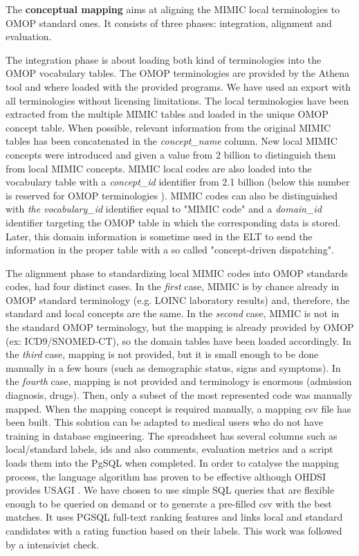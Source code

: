 The \textbf{conceptual mapping} aims at aligning the MIMIC local terminologies
to OMOP standard ones. It consists of three phases: integration, alignment and
evaluation.

The integration phase is about loading both kind of terminologies into the OMOP
vocabulary tables.
The OMOP terminologies are provided by the Athena tool \cite{ohdsi-athena} and
where loaded with the provided programs. We have used an export with all
terminologies without licensing limitations.
The local terminologies have been extracted from the multiple MIMIC tables and
loaded in the unique OMOP concept table. When possible, relevant information
from the original MIMIC tables has been concatenated in the
\textit{concept\_name} column. 
New local MIMIC concepts were introduced and given a value from 2 billion to
distinguish them from local MIMIC concepts.  MIMIC local codes are also loaded
into the vocabulary table with a \textit{concept\_id} identifier from 2.1
billion (below this number is reserved for OMOP terminologies
\cite{omop-documentation-pdf}). 
MIMIC codes can also be distinguished with \textit{the vocabulary\_id}
identifier equal to "MIMIC code" and a \textit{domain\_id} identifier targeting
the OMOP table in which the corresponding data is stored. Later, this domain
information is sometime used in the ELT to send the information in the proper
table with a so called "concept-driven dispatching".

The alignment phase to standardizing local MIMIC codes into OMOP standards
codes, had four distinct cases. In the \emph{first} case, MIMIC is by chance
already in OMOP standard terminology (e.g. LOINC laboratory results) and,
therefore, the standard and local concepts are the same. In the \emph{second}
case, MIMIC is not in the standard OMOP terminology, but the mapping is already
provided by OMOP (ex: ICD9/SNOMED-CT), so the domain tables have been loaded
accordingly.  In the \emph{third} case, mapping is not provided, but it is
small enough to be done manually in a few hours (such as demographic status,
signs and symptoms). In the \emph{fourth} case, mapping is not provided and
terminology is enormous (admission diagnosis, drugs). Then, only a subset of
the most represented code was manually mapped.
When the mapping concept is required manually, a mapping csv file has been
built.  This solution can be adapted to medical users who do not have training
in database engineering. The spreadsheet has several columns such as
local/standard labels, ids and also comments, evaluation metrics and a script
loads them into the PgSQL when completed. In order to catalyse the mapping
process, the language algorithm has proven to be effective
\cite{schema-matching} although OHDSI provides USAGI \cite{usagi}. We have
chosen to use simple SQL queries that are flexible enough to be queried on
demand or to generate a pre-filled csv with the best matches. It uses PGSQL
full-text ranking features  and links local and standard candidates with a
rating function based on their labels. This work was followed by a intensivist
check.

